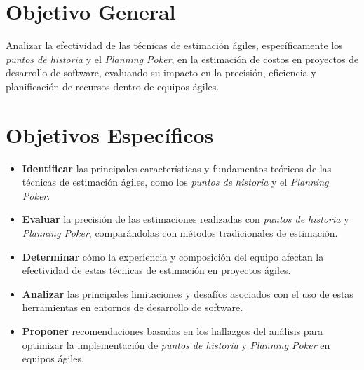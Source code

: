 \section{Objetivo General}

Analizar la efectividad de las técnicas de estimación ágiles, específicamente los \textit{puntos de historia} y el \textit{Planning Poker}, en la estimación de costos en proyectos de desarrollo de software, evaluando su impacto en la precisión, eficiencia y planificación de recursos dentro de equipos ágiles.

\section{Objetivos Específicos}

\begin{itemize}
    \item \textbf{Identificar} las principales características y fundamentos teóricos de las técnicas de estimación ágiles, como los \textit{puntos de historia} y el \textit{Planning Poker}.
    \item \textbf{Evaluar} la precisión de las estimaciones realizadas con \textit{puntos de historia} y \textit{Planning Poker}, comparándolas con métodos tradicionales de estimación.
    \item \textbf{Determinar} cómo la experiencia y composición del equipo afectan la efectividad de estas técnicas de estimación en proyectos ágiles.
    \item \textbf{Analizar} las principales limitaciones y desafíos asociados con el uso de estas herramientas en entornos de desarrollo de software.
    \item \textbf{Proponer} recomendaciones basadas en los hallazgos del análisis para optimizar la implementación de \textit{puntos de historia} y \textit{Planning Poker} en equipos ágiles.
\end{itemize}
